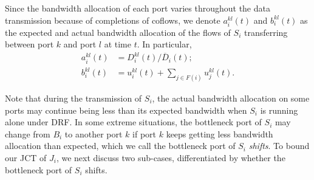 \documentclass[10pt,journal,compsoc]{IEEEtran}
\begin{document}
\begin{IEEEproof}
Since the bandwidth allocation of each port varies throughout the data transmission because of completions of coflows, we denote $a_i^{kl}(t)$ and $b_i^{kl}(t)$ as the expected and actual bandwidth allocation of the flows  of $S_i$ transferring between port $k$ and port $l$ at time $t$.
%
In particular,
\begin{align}
	\label{actual} a_i^{kl}(t) &= D_i^{kl}(t)/\overline{D}_i(t);\\
	b_i^{kl}(t) &= u_i^{kl}(t) + \sum_{j\in F(i)}u_j^{kl}(t).
\end{align}

Note that during the transmission of $S_i$, the actual bandwidth allocation on some ports may continue being less than its expected bandwidth when $S_i$  is running alone under DRF.
%
In some extreme situations, the bottleneck port of $S_i$ may change from $B_i$ to another port $k$ if port $k$ keeps getting less bandwidth allocation than expected, which we call the bottleneck port of $S_i$ \emph{shifts}.
%
To bound our JCT of $J_i$, we next discuss two sub-cases, differentiated by whether the bottleneck port of $S_i$ shifts.


\end{IEEEproof}
\end{document}
